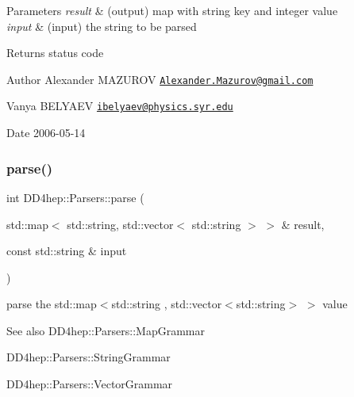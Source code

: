 \begin{DoxyParams}{Parameters}
{\em result} & (output) map with string key and integer value \\
\hline
{\em input} & (input) the string to be parsed \\
\hline
\end{DoxyParams}
\begin{DoxyReturn}{Returns}
status code
\end{DoxyReturn}
\begin{DoxyAuthor}{Author}
Alexander M\+A\+Z\+U\+R\+OV \href{mailto:Alexander.Mazurov@gmail.com}{\tt Alexander.\+Mazurov@gmail.\+com} 

Vanya B\+E\+L\+Y\+A\+EV \href{mailto:ibelyaev@physics.syr.edu}{\tt ibelyaev@physics.\+syr.\+edu} 
\end{DoxyAuthor}
\begin{DoxyDate}{Date}
2006-\/05-\/14 
\end{DoxyDate}
\hypertarget{namespace_d_d4hep_1_1_parsers_a010112afc7cbf060b08876d5d4dee7d5}{}\label{namespace_d_d4hep_1_1_parsers_a010112afc7cbf060b08876d5d4dee7d5} 
\subsubsection{\texorpdfstring{parse()}{parse()}\hspace{0.1cm}{\footnotesize\ttfamily [11/21]}}
{\footnotesize\ttfamily int D\+D4hep\+::\+Parsers\+::parse (\begin{DoxyParamCaption}\item[{std\+::map$<$ std\+::string, std\+::vector$<$ std\+::string $>$ $>$ \&}]{result,  }\item[{const std\+::string \&}]{input }\end{DoxyParamCaption})}



parse the {\ttfamily std\+::map$<$std\+::string , std\+::vector$<$std\+::string$>$ $>$} value 

\begin{DoxySeeAlso}{See also}
D\+D4hep\+::\+Parsers\+::\+Map\+Grammar 

D\+D4hep\+::\+Parsers\+::\+String\+Grammar 

D\+D4hep\+::\+Parsers\+::\+Vector\+Grammar 
\end{DoxySeeAlso}

